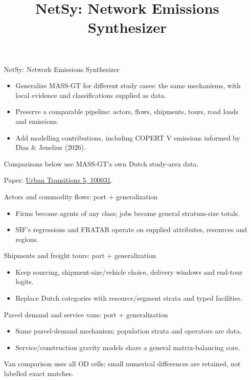 \documentclass[aspectratio=169]{beamer}
\title{NetSy: Network Emissions Synthesizer}
\date{}
\begin{document}
\begin{frame}{NetSy: Network Emissions Synthesizer}
\begin{itemize}
\item Generalize MASS-GT for different study cases: the same mechanisms, with local evidence and classifications supplied as data.
\item Preserve a comparable pipeline: actors, flows, shipments, tours, road loads and emissions.
\item Add modelling contributions, including COPERT V emissions informed by Dias \& Jenelius (2026).
\end{itemize}
\vfill
\footnotesize Comparisons below use MASS-GT's own Dutch study-area data.\par
\scriptsize Paper: \href{https://doi.org/10.1016/j.ubtr.2026.100031}{Urban Transitions 5, 100031}.
\end{frame}

\begin{frame}{Actors and commodity flows: port + generalization}
\ActorTable
\medskip
\begin{itemize}
\item Firms become agents of any class; jobs become general stratum-size totals.
\item SIF's regressions and FRATAR operate on supplied attributes, resources and regions.
\end{itemize}
\vfill\scriptsize\SeedNote
\end{frame}

\begin{frame}{Shipments and freight tours: port + generalization}
\FreightTable
\medskip
\begin{itemize}
\item Keep sourcing, shipment-size/vehicle choice, delivery windows and end-tour logits.
\item Replace Dutch categories with resource/segment strata and typed facilities.
\end{itemize}
\vfill\scriptsize\SeedNote
\end{frame}

\begin{frame}{Parcel demand and service vans: port + generalization}
\ParcelVanTable
\medskip
\begin{itemize}
\item Same parcel-demand mechanism; population strata and operators are data.
\item Service/construction gravity models share a general matrix-balancing core.
\end{itemize}
\vfill\scriptsize Van comparison uses all OD cells; small numerical differences are retained, not labelled exact matches.
\end{frame}
\end{document}
